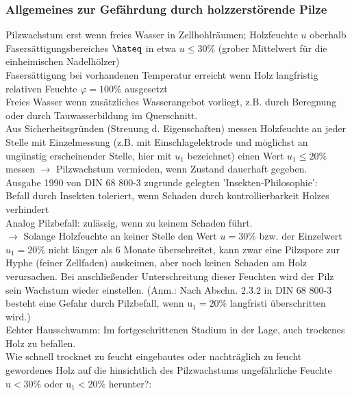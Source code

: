 \documentclass[fleqn,twoside]{article}
\begin{document}
        \subsubsection{Allgemeines zur Gefährdung durch holzzerstörende Pilze} 
        Pilzwachstum erst wenn freies Wasser in Zellhohlräumen; Holzfeuchte $u$ oberhalb Fasersättigungsbereiches $\hateq$ in etwa $u\leq 30 \%$ (grober Mittelwert für die einheimischen Nadelhölzer)\\ 
        Fasersättigung bei vorhandenen Temperatur erreicht wenn Holz langfristig relativen Feuchte $\varphi=100 \%$ ausgesetzt\\  Freies Wasser wenn zusätzliches Wasserangebot vorliegt, z.B. durch Beregnung oder durch Tauwasserbildung im Querschnitt.\\
        Aus Sicherheitsgründen (Streuung d. Eigenschaften) messen Holzfeuchte an jeder Stelle mit Einzelmessung (z.B. mit Einschlagelektrode und möglichst an ungünstig erscheinender Stelle, hier mit $u_1$ bezeichnet) einen Wert $u_1 \leq 20 \%$ \\
        messen $\rightarrow$ Pilzwachstum vermieden, wenn Zustand dauerhaft gegeben.\\
    
        Ausgabe 1990 von DIN 68 800-3 zugrunde gelegten 'Insekten-Philosophie':\\ 
        Befall durch Insekten toleriert, wenn  Schaden durch kontrollierbarkeit Holzes verhindert\\
        Analog Pilzbefall: zulässig, wenn zu keinem Schaden führt.\\
        $\rightarrow$ Solange Holzfeuchte an keiner Stelle den Wert $u=30 \%$ bzw. der Einzelwert $u_1=20 \%$ nicht länger als 6 Monate überschreitet, kann zwar eine Pilzspore zur Hyphe (feiner Zellfaden) auskeimen, aber noch keinen Schaden am Holz verursachen. Bei anschließender Unterschreitung dieser Feuchten wird der Pilz sein Wachstum wieder einstellen. (Anm.: Nach Abschn. $2.3 .2$ in DIN 68 800-3 besteht eine Gefahr durch Pilzbefall, wenn $\mathrm{u}_1=20 \%$ langfristi überschritten wird.)\\
        
        Echter Hausschwamm: Im fortgeschrittenen Stadium in der Lage, auch trockenes Holz zu befallen.\\
        Wie schnell trocknet zu feucht eingebautes oder nachträglich zu feucht gewordenes Holz auf die hinsichtlich des Pilzwachstums ungefährliche Feuchte $\mathrm{u}<30 \%$ oder $\mathrm{u}_1<20 \%$ herunter?:\\ 
\end{document}
